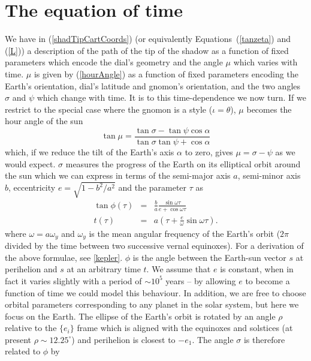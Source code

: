 \documentclass[12pt]{article}
\newcommand{\nn}{\nonumber}
\newcommand{\om}{\omega}
\newcommand{\omy}{\omega_y}
\begin{document}
\section{The equation of time} \label{eot}
%
We have in (\ref{shadTipCartCoords}) (or equivalently Equations~(\ref{tanzeta}) and (\ref{L})) a description of the path of the tip of the shadow as a function of fixed parameters which encode the dial's geometry and the angle $\mu$ which varies with time. $\mu$ is given by (\ref{hourAngle}) as a function of fixed parameters encoding the Earth's orientation, dial's latitude and gnomon's orientation, and the two angles $\sigma$ and $\psi$ which change with time. It is to this time-dependence we now turn. If we restrict to the special case where the gnomon is a style ($\iota = \theta$), $\mu$ becomes the hour angle of the sun
%
\begin{equation} \label{trueHourAngle}
\tan\mu = \frac{\tan\sigma - \tan\psi\cos\alpha}{\tan\sigma\tan\psi + \cos\alpha}
\end{equation}
%
which, if we reduce the tilt of the Earth's axis $\alpha$ to zero, gives $\mu = \sigma - \psi$ as we would expect. $\sigma$ measures the progress of the Earth on its elliptical orbit around the sun which we can express in terms of the semi-major axis $a$, semi-minor axis $b$, eccentricity $e = \sqrt{1 - b^2/a^2}$ and the parameter $\tau$ as
%
\begin{eqnarray} \label{keplerCoords}
\tan\phi(\tau) & = & \frac{b}{a} \frac{\sin \om \tau}{e + \cos \om \tau} \\ \nn
t(\tau) & = & a\left(\tau + \frac{e}{\omega}\sin \om \tau\right).
\end{eqnarray}
%
where $\omega = a\omy$ and $\omy$ is the mean angular frequency of the Earth's orbit ($2\pi$ divided by the time between two successive vernal equinoxes). For a derivation of the above formulae, see \ref{kepler}. $\phi$ is the angle between the Earth-sun vector $s$ at perihelion and $s$ at an arbitrary time $t$. We assume that $e$ is constant, when in fact it varies slightly with a period of $\sim 10^5$ years -- by allowing $e$ to become a function of time we could model this behaviour. In addition, we are free to choose orbital parameters corresponding to any planet in the solar system, but here we focus on the Earth. The ellipse of the Earth's orbit is rotated by an angle $\rho$ relative to the $\{e_i\}$ frame which is aligned with the equinoxes and solstices (at present $\rho \sim 12.25^\circ$) and perihelion is closest to $-e_1$. The angle $\sigma$ is therefore related to $\phi$ by
\end{document}
